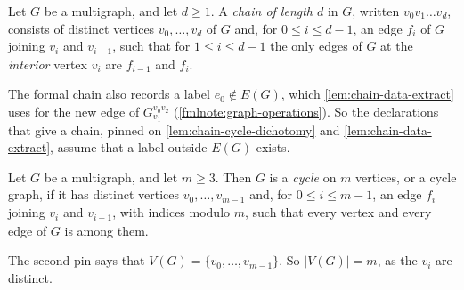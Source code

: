 \begin{definition}
  \label{def:chain-data}
  \leanok
  Let $G$ be a multigraph, and let $d \ge 1$. A \emph{chain of length
  $d$} in $G$, written $v_0 v_1 \dots v_d$, consists of distinct vertices
  $v_0, \dots, v_d$ of $G$ and, for $0 \le i \le d - 1$, an edge $f_i$ of
  $G$ joining $v_i$ and $v_{i+1}$, such that for $1 \le i \le d - 1$ the
  only edges of $G$ at the \emph{interior} vertex $v_i$ are $f_{i-1}$ and
  $f_i$.
\end{definition}
\begin{fmlnote}
  The formal chain also records a label $e_0 \notin E(G)$, which
  \cref{lem:chain-data-extract} uses for the new edge of
  $G_{v_1}^{v_0 v_2}$ (\cref{fmlnote:graph-operations}). So the
  declarations that give a chain, pinned on
  \cref{lem:chain-cycle-dichotomy} and \cref{lem:chain-data-extract},
  assume that a label outside $E(G)$ exists.
\end{fmlnote}

\begin{definition}
  \label{def:cycle-data}
  \leanok
  Let $G$ be a multigraph, and let $m \ge 3$. Then $G$ is a \emph{cycle}
  on $m$ vertices, or a cycle graph, if it has distinct vertices
  $v_0, \dots, v_{m-1}$ and, for $0 \le i \le m - 1$, an edge $f_i$
  joining $v_i$ and $v_{i+1}$, with indices modulo $m$, such that every
  vertex and every edge of $G$ is among them.
\end{definition}
\begin{fmlnote}
  The second pin says that $V(G) = \{v_0, \dots, v_{m-1}\}$. So
  $|V(G)| = m$, as the $v_i$ are distinct.
\end{fmlnote}

